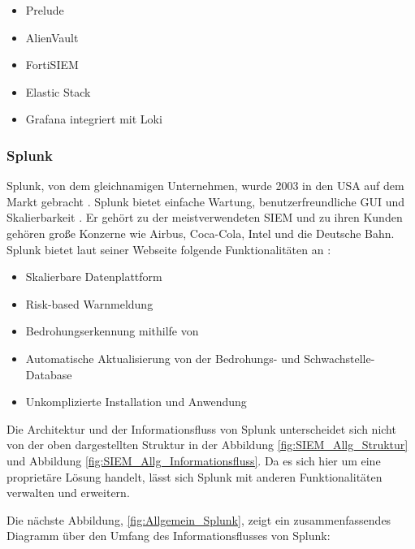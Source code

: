 \begin{itemize}[noitemsep]
   \item Prelude %
   \item AlienVault  %
   \item FortiSIEM %
   \item Elastic Stack %
   \item Grafana integriert mit Loki %
\end{itemize}

\subsubsection{Splunk}
Splunk, von dem gleichnamigen Unternehmen, wurde 2003 in den USA auf dem Markt gebracht \citep{Splunk_splunk}. Splunk bietet einfache Wartung, benutzerfreundliche \gls{GUI} und Skalierbarkeit \citep{Kazarov_Splunk}. Er gehört zu der meistverwendeten \gls{SIEM} und zu ihren Kunden gehören große Konzerne wie Airbus, Coca-Cola, Intel und die Deutsche Bahn. Splunk bietet laut seiner Webseite folgende Funktionalitäten an \citep{Splunk_SPE}:

\begin{itemize}[noitemsep]
   \item Skalierbare Datenplattform 
   \item Risk-based Warnmeldung
   \item Bedrohungserkennung mithilfe von  
   \item Automatische Aktualisierung von der Bedrohungs- und Schwachstelle-Database 
   \item Unkomplizierte Installation und Anwendung 
\end{itemize}

Die Architektur und der Informationsfluss von Splunk unterscheidet sich nicht von der oben dargestellten Struktur in der Abbildung \ref{fig:SIEM_Allg_Struktur} und Abbildung \ref{fig:SIEM_Allg_Informationsfluss}. Da es sich hier um eine proprietäre Lösung handelt, lässt sich Splunk mit anderen Funktionalitäten verwalten und erweitern. 

Die nächste Abbildung, \ref{fig:Allgemein_Splunk}, zeigt ein zusammenfassendes Diagramm über den Umfang des Informationsflusses von Splunk:


